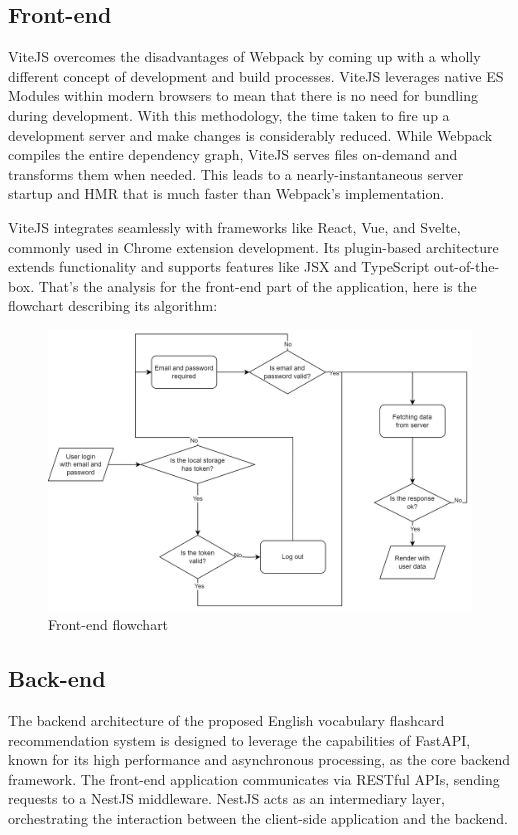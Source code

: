 \documentclass{article}
\begin{document}
\subsection{Front-end}

ViteJS overcomes the disadvantages of Webpack by coming up with a wholly different concept of development and build processes. ViteJS leverages native ES Modules within modern browsers to mean that there is no need for bundling during development. With this methodology, the time taken to fire up a development server and make changes is considerably reduced. While Webpack compiles the entire dependency graph, ViteJS serves files on-demand and transforms them when needed. This leads to a nearly-instantaneous server startup and HMR that is much faster than Webpack’s implementation.

ViteJS integrates seamlessly with frameworks like React, Vue, and Svelte, commonly used in Chrome extension development. Its plugin-based architecture extends functionality and supports features like JSX and TypeScript out-of-the-box. That's the analysis for the front-end part of the application, here is the flowchart describing its algorithm:

\begin{figure}[H]
    \centering
    \includegraphics[width=0.75\linewidth]{flow-chart.png}
    \caption{Front-end flowchart}
    \label{fig:enter-label}
\end{figure}

\subsection{Back-end}
The backend architecture of the proposed English vocabulary flashcard recommendation system is designed to leverage the capabilities of FastAPI, known for its high performance and asynchronous processing, as the core backend framework. The front-end application communicates via RESTful APIs, sending requests to a NestJS middleware. NestJS acts as an intermediary layer, orchestrating the interaction between the client-side application and the backend. 
\end{document}
